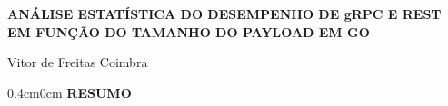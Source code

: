 \documentclass[a4paper, 12pt]{article}
\begin{document}

\begin{center}
    {\fontsize{16}{19}\selectfont\bfseries
    ANÁLISE ESTATÍSTICA DO DESEMPENHO DE gRPC E REST EM FUNÇÃO DO TAMANHO DO PAYLOAD EM GO\par}
    \vspace{14pt}
    Vitor de Freitas Coimbra
\end{center}

\vspace{6pt}

\begin{adjustwidth}{0.4cm}{0cm}
{\fontsize{13}{16}\selectfont\bfseries RESUMO}
\end{adjustwidth}

\vspace{4pt}
\end{document}
